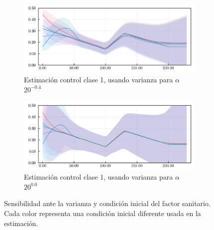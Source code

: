\begin{figure}[!h]
\begin{subfigure}[b]{0.47\textwidth}
     \includegraphics[width=\textwidth]{img/resultados/synth/sensialphacov_alphacov0-302_0alphaini0-15_0-1_0-45_high1_b2real1-88_gereal0-1961_gireal0-1389_acov0-8_aini0-27675_gcov0-05gamma_e_0-1961_gamma_i_0-1389_beta_2_1-8800.pdf}
     \caption{Estimación control clase 1, usando varianza para \(\alpha\) \(20^{-0.4}\)}
     \label{fig:legend-sensi-acov-class1--0-4}
\end{subfigure} 
\hfill
\begin{subfigure}[b]{0.47\textwidth}
     \centering
     \includegraphics[width=\textwidth]{img/resultados/synth/sensialphacov_alphacov1-000_0alphaini0-15_0-1_0-45_high1_b2real1-88_gereal0-1961_gireal0-1389_acov0-8_aini0-27675_gcov0-05gamma_e_0-1961_gamma_i_0-1389_beta_2_1-8800.pdf}
     \caption{Estimación control clase 1, usando varianza para \(\alpha\) \(20^{0.0}\)}
     \label{fig:legend-sensi-acov-class1--0-0}
\end{subfigure} 
\hfill
\begin{subfigure}[b]{0.75\textwidth}
 \centering
\scalebox{0.7}{
\begin{tikzpicture}
\end{tikzpicture}
}
\end{subfigure}

\caption[Sensibilidad ante la varianza y condición inicial del factor sanitario.]{Sensibilidad ante la varianza y condición inicial del factor sanitario. Cada color representa una condición inicial diferente usada en la estimación.} \label{fig:legend-sensi-alphacov}
\end{figure}

